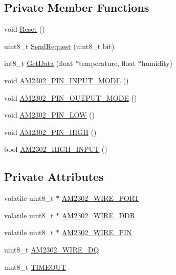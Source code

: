 \subsection*{Private Member Functions}
\begin{DoxyCompactItemize}
\item 
void \hyperlink{classDHT22_acfa5b6640685318856f09aa84080fd76}{Reset} ()
\item 
uint8\+\_\+t \hyperlink{classDHT22_acf1337337af198d3a6216f625c70cbc7}{Send\+Request} (uint8\+\_\+t bit)
\item 
int8\+\_\+t \hyperlink{classDHT22_ae8fbd3966b285fd9b7318dcad2036e93}{Get\+Data} (float $\ast$temperature, float $\ast$humidity)
\item 
void \hyperlink{classDHT22_aae1d3f75d7a34843d3a4b533c56e474c}{A\+M2302\+\_\+\+P\+I\+N\+\_\+\+I\+N\+P\+U\+T\+\_\+\+M\+O\+DE} ()
\item 
void \hyperlink{classDHT22_a96e379a2cf2c6239253c9f706959253c}{A\+M2302\+\_\+\+P\+I\+N\+\_\+\+O\+U\+T\+P\+U\+T\+\_\+\+M\+O\+DE} ()
\item 
void \hyperlink{classDHT22_a312eb760672d2818f8de68c553bd5a21}{A\+M2302\+\_\+\+P\+I\+N\+\_\+\+L\+OW} ()
\item 
void \hyperlink{classDHT22_a98ca5e15fa219b57e819691e16707122}{A\+M2302\+\_\+\+P\+I\+N\+\_\+\+H\+I\+GH} ()
\item 
bool \hyperlink{classDHT22_ae2f4f7c34bf80cd3f4bf0da52fa96572}{A\+M2302\+\_\+\+H\+I\+G\+H\+\_\+\+I\+N\+P\+UT} ()
\end{DoxyCompactItemize}
\subsection*{Private Attributes}
\begin{DoxyCompactItemize}
\item 
volatile uint8\+\_\+t $\ast$ \hyperlink{classDHT22_a0966fbe5db17d7ca6f1f036830e27502}{A\+M2302\+\_\+\+W\+I\+R\+E\+\_\+\+P\+O\+RT}
\item 
volatile uint8\+\_\+t $\ast$ \hyperlink{classDHT22_a69649c4246cd4e255a6e61961b0c948b}{A\+M2302\+\_\+\+W\+I\+R\+E\+\_\+\+D\+DR}
\item 
volatile uint8\+\_\+t $\ast$ \hyperlink{classDHT22_a5555aa8aa95149f3a3723582bb4ceffa}{A\+M2302\+\_\+\+W\+I\+R\+E\+\_\+\+P\+IN}
\item 
uint8\+\_\+t \hyperlink{classDHT22_a4b6de6908e5eb743dec2c254ef89782e}{A\+M2302\+\_\+\+W\+I\+R\+E\+\_\+\+DQ}
\item 
uint8\+\_\+t \hyperlink{classDHT22_acbca744f7ed6f46e2d060c7047b0b1a4}{T\+I\+M\+E\+O\+UT}
\end{DoxyCompactItemize}


